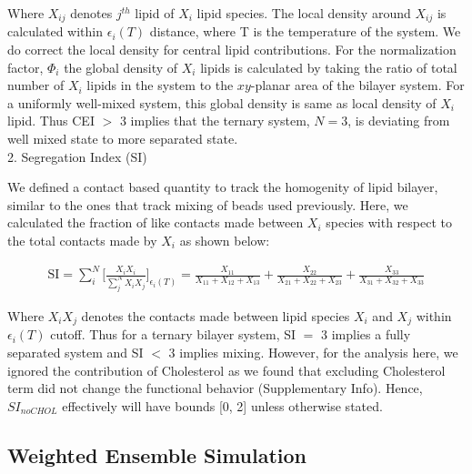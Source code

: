 \documentclass{biophys-new}
\begin{document}
Where $X_{ij}$ denotes $j^{th}$ lipid of $X_i$ lipid species.
The local density around $X_{ij}$ is calculated within $\epsilon_i(T)$ distance, where T is the temperature of the system.
We do correct the local density for central lipid contributions.
For the normalization factor, $\Phi_i$ the global density of $X_i$ lipids is calculated by taking the ratio of total number of $X_i$ lipids in the system to the $xy$-planar area of the bilayer system.
For a uniformly well-mixed system, this global density is same as local density of $X_{i}$ lipid.
Thus CEI $>$ 3 implies that the ternary system, $N=3$, is deviating from well mixed state to more separated state. 
\\

2. Segregation Index (SI)

We defined a contact based quantity to track the homogenity of lipid bilayer, similar to the ones that track mixing of beads used previously\cite{Marigo2012,Kumar2020}.
Here, we calculated the fraction of like contacts made between $X_i$ species with respect to the total contacts made by $X_i$ as shown below:

\begin{equation}
    \begin{aligned}
    \label{eq:CLT}
    \text{SI} = \sum_{i}^{N}\Bigg[\frac{X_iX_i}{\sum_{j}^{N}X_iX_j}\Bigg]_{\text{$\epsilon_i(T)$}} = \frac{X_{11}}{X_{11} + X_{12} + X_{13}} + \frac{X_{22}}{X_{21} + X_{22} + X_{23}} + \frac{X_{33}}{X_{31} + X_{32} + X_{33}}
    \end{aligned}
\end{equation}

Where $X_iX_j$ denotes the contacts made between lipid species $X_i$ and $X_j$ within $\epsilon_i(T)$ cutoff.
Thus for a ternary bilayer system, SI $=$ 3 implies a fully separated system and SI $<$ 3 implies mixing.
However, for the analysis here, we ignored the contribution of Cholesterol as we found that excluding Cholesterol term did not change the functional behavior (Supplementary Info).
Hence, $SI_{noCHOL}$ effectively will have bounds [0, 2] unless otherwise stated.    

\subsection*{Weighted Ensemble Simulation}
\end{document}
